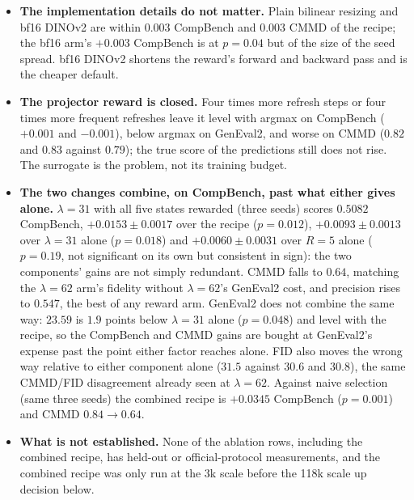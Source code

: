 \documentclass[11pt,a4paper]{article}
\begin{document}
\begin{itemize}
\item \textbf{The implementation details do not matter.} Plain bilinear resizing and bf16 DINOv2 are within $0.003$ CompBench and $0.003$ CMMD of the recipe; the bf16 arm's $+0.003$ CompBench is at $p=0.04$ but of the size of the seed spread. bf16 DINOv2 shortens the reward's forward and backward pass and is the cheaper default.
\item \textbf{The projector reward is closed.} Four times more refresh steps or four times more frequent refreshes leave it level with argmax on CompBench ($+0.001$ and $-0.001$), below argmax on GenEval2, and worse on CMMD ($0.82$ and $0.83$ against $0.79$); the true score of the predictions still does not rise. The surrogate is the problem, not its training budget.
\item \textbf{The two changes combine, on CompBench, past what either gives alone.} $\lambda=31$ with all five states rewarded (three seeds) scores $0.5082$ CompBench, $+0.0153\pm0.0017$ over the recipe ($p=0.012$), $+0.0093\pm0.0013$ over $\lambda=31$ alone ($p=0.018$) and $+0.0060\pm0.0031$ over $R=5$ alone ($p=0.19$, not significant on its own but consistent in sign): the two components' gains are not simply redundant. CMMD falls to $0.64$, matching the $\lambda=62$ arm's fidelity without $\lambda=62$'s GenEval2 cost, and precision rises to $0.547$, the best of any reward arm. GenEval2 does not combine the same way: $23.59$ is $1.9$ points below $\lambda=31$ alone ($p=0.048$) and level with the recipe, so the CompBench and CMMD gains are bought at GenEval2's expense past the point either factor reaches alone. FID also moves the wrong way relative to either component alone ($31.5$ against $30.6$ and $30.8$), the same CMMD/FID disagreement already seen at $\lambda=62$. Against naive selection (same three seeds) the combined recipe is $+0.0345$ CompBench ($p=0.001$) and CMMD $0.84\to0.64$.
\item \textbf{What is not established.} None of the ablation rows, including the combined recipe, has held-out or official-protocol measurements, and the combined recipe was only run at the 3k scale before the 118k scale up decision below.
\end{itemize}
\end{document}
